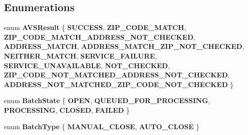 \subsection*{Enumerations}
\begin{DoxyCompactItemize}
\item 
\mbox{\label{namespacecom_1_1clover_1_1sdk_1_1v3_1_1payments_a81b51961db7fb2e8c34fefd28183a8a1}} 
enum {\bfseries A\+V\+S\+Result} \{ \newline
{\bfseries S\+U\+C\+C\+E\+SS}, 
{\bfseries Z\+I\+P\+\_\+\+C\+O\+D\+E\+\_\+\+M\+A\+T\+CH}, 
{\bfseries Z\+I\+P\+\_\+\+C\+O\+D\+E\+\_\+\+M\+A\+T\+C\+H\+\_\+\+A\+D\+D\+R\+E\+S\+S\+\_\+\+N\+O\+T\+\_\+\+C\+H\+E\+C\+K\+ED}, 
{\bfseries A\+D\+D\+R\+E\+S\+S\+\_\+\+M\+A\+T\+CH}, 
\newline
{\bfseries A\+D\+D\+R\+E\+S\+S\+\_\+\+M\+A\+T\+C\+H\+\_\+\+Z\+I\+P\+\_\+\+N\+O\+T\+\_\+\+C\+H\+E\+C\+K\+ED}, 
{\bfseries N\+E\+I\+T\+H\+E\+R\+\_\+\+M\+A\+T\+CH}, 
{\bfseries S\+E\+R\+V\+I\+C\+E\+\_\+\+F\+A\+I\+L\+U\+RE}, 
{\bfseries S\+E\+R\+V\+I\+C\+E\+\_\+\+U\+N\+A\+V\+A\+I\+L\+A\+B\+LE}, 
\newline
{\bfseries N\+O\+T\+\_\+\+C\+H\+E\+C\+K\+ED}, 
{\bfseries Z\+I\+P\+\_\+\+C\+O\+D\+E\+\_\+\+N\+O\+T\+\_\+\+M\+A\+T\+C\+H\+E\+D\+\_\+\+A\+D\+D\+R\+E\+S\+S\+\_\+\+N\+O\+T\+\_\+\+C\+H\+E\+C\+K\+ED}, 
{\bfseries A\+D\+D\+R\+E\+S\+S\+\_\+\+N\+O\+T\+\_\+\+M\+A\+T\+C\+H\+E\+D\+\_\+\+Z\+I\+P\+\_\+\+C\+O\+D\+E\+\_\+\+N\+O\+T\+\_\+\+C\+H\+E\+C\+K\+ED}
 \}
\item 
\mbox{\label{namespacecom_1_1clover_1_1sdk_1_1v3_1_1payments_afd1102ee7e347adf5b7343518d146859}} 
enum {\bfseries Batch\+State} \{ \newline
{\bfseries O\+P\+EN}, 
{\bfseries Q\+U\+E\+U\+E\+D\+\_\+\+F\+O\+R\+\_\+\+P\+R\+O\+C\+E\+S\+S\+I\+NG}, 
{\bfseries P\+R\+O\+C\+E\+S\+S\+I\+NG}, 
{\bfseries C\+L\+O\+S\+ED}, 
\newline
{\bfseries F\+A\+I\+L\+ED}
 \}
\item 
\mbox{\label{namespacecom_1_1clover_1_1sdk_1_1v3_1_1payments_aa661d537c95b582976caf4a1745309f6}} 
enum {\bfseries Batch\+Type} \{ {\bfseries M\+A\+N\+U\+A\+L\+\_\+\+C\+L\+O\+SE}, 
{\bfseries A\+U\+T\+O\+\_\+\+C\+L\+O\+SE}
 \}
\item 
\mbox{\label{namespacecom_1_1clover_1_1sdk_1_1v3_1_1payments_ac92e851a362529ec3fa138bd64dec615}} 

\end{DoxyCompactItemize}
